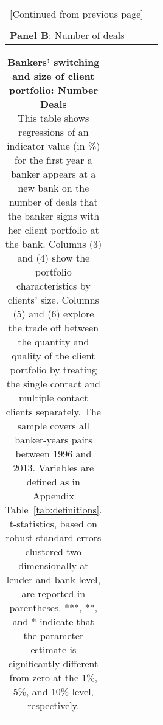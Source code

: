 \begin{table}[H] \begin{center} \begin{threeparttable} 
 	\begin{tabular*}{\hsize} {@{\hskip\tabcolsep\extracolsep\fill}l*{7}{c}}
 	 	 \multicolumn{7}{c}{[Continued from previous page]} \\ \\
	 	 \multicolumn{7}{l}{\textbf{Panel B}: Number of deals} \\
			\toprule  
		   	\bottomrule 

	\end{tabular*} \end{threeparttable}   \end{center} \end{table}
\clearpage \newpage



\begin{table}[H] \begin{center} 
		\caption{\textbf{Bankers' switching and size of client portfolio: Number Deals} \\ This table shows regressions of an indicator value (in \%) for the first year a banker appears at a new bank on the number of deals  that the banker signs with her client portfolio at the bank. Columns (3) and (4) show the portfolio characteristics by clients' size. Columns (5) and (6) explore the trade off between the quantity and quality of the client portfolio by treating the single contact and multiple contact clients separately. The sample covers all banker-years pairs between 1996 and 2013. Variables are defined as in Appendix Table~\ref{tab:definitions}. t-statistics, based on robust standard errors clustered two dimensionally at lender and bank level, are reported in parentheses. ***, **, and * indicate that the parameter estimate is significantly different from zero at the 1\%, 5\%, and 10\% level, respectively.} 
		\label{tab:banker_dealno} 
		\begin{threeparttable} 
			\begin{tabular*}{\hsize} {@{\hskip\tabcolsep\extracolsep\fill}l*{7}{c}}
				\multicolumn{7}{l}{\textbf{}} \\ \toprule 
				
				  
				\bottomrule 
\end{tabular*} 	\end{threeparttable}  \end{center} 
\end{table}
\clearpage \newpage



